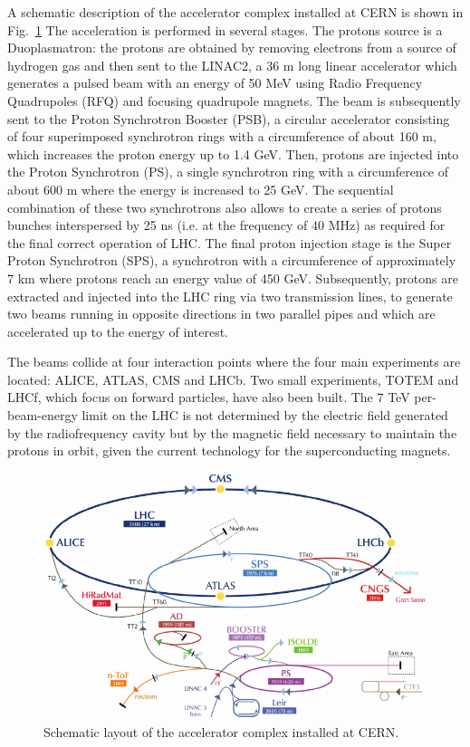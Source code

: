 A schematic description of the accelerator complex installed at CERN is shown in Fig.~\ref{lhc}
The acceleration is performed in several stages. The protons source is
a Duoplasmatron: the protons are obtained by removing electrons from a
source of hydrogen gas 
and then sent to the LINAC2, a 36 m long linear accelerator which generates a pulsed
beam with an energy of 50 MeV using Radio Frequency Quadrupoles (RFQ) and focusing
quadrupole magnets. The beam is subsequently sent to the Proton Synchrotron Booster
(PSB), a circular accelerator consisting of four superimposed synchrotron rings with a
circumference of about 160 m, which increases the proton energy up to 1.4 GeV. Then,
protons are injected into the Proton Synchrotron (PS), a single synchrotron ring with a
circumference of about 600 m where the energy is increased to 25 GeV. The sequential combination of these two synchrotrons also allows to create a series of protons bunches
interspersed by 25 ns (i.e. at the frequency of 40 MHz) as required for the final correct
operation of LHC. The final proton injection stage is the Super Proton Synchrotron (SPS),
a synchrotron with a circumference of approximately 7 km where protons reach an energy
value of 450 GeV. Subsequently, protons are extracted and injected into the LHC ring
via two transmission lines, to generate two beams running in opposite directions in two
parallel pipes and which are accelerated up to the energy of interest.

The beams collide
at four interaction points where the four main experiments are located: ALICE, ATLAS, CMS and LHCb. Two small experiments, TOTEM and LHCf, which focus on forward particles, have also been built.
The 7 TeV per-beam-energy limit on the LHC
is not determined by the electric field generated by the radiofrequency cavity but by the
magnetic field necessary to maintain the protons in orbit, given the current technology
for the superconducting magnets.
\begin{figure}
\centering
\includegraphics[scale= 0.5]{../Cap2/lhc}
\caption{Schematic layout of the accelerator complex installed at CERN.}
\label{lhc}
\end{figure}

